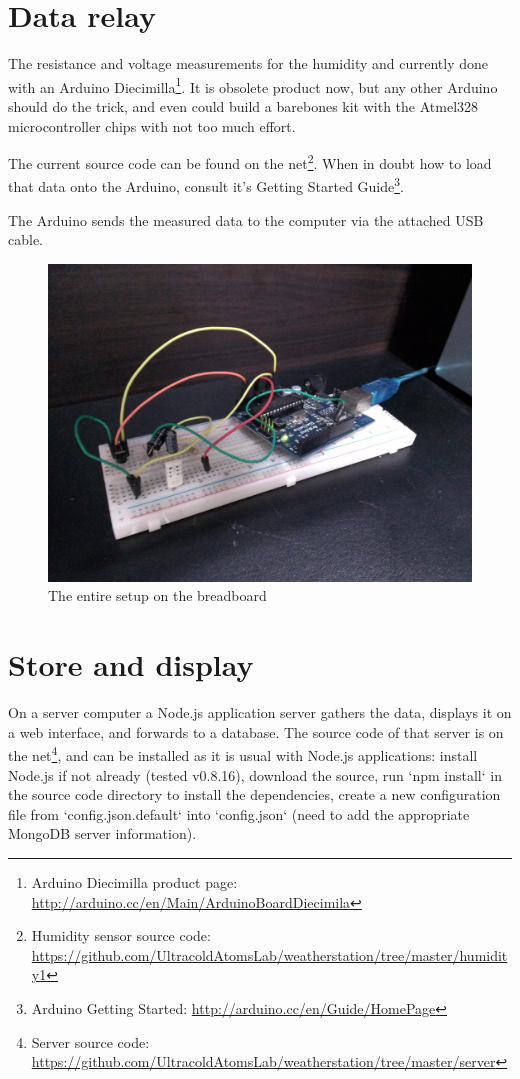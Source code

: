 \documentclass[12pt,a4paper]{article}
\begin{document}
\section{Data relay}

The resistance and voltage measurements for the humidity and currently done with an Arduino Diecimilla\footnote{Arduino Diecimilla product page: \url{http://arduino.cc/en/Main/ArduinoBoardDiecimila}}. It is obsolete product now, but any other Arduino should do the trick, and even could build a barebones kit with the Atmel328 microcontroller chips with not too much effort.

The current source code can be found on the net\footnote{Humidity sensor source code: \url{https://github.com/UltracoldAtomsLab/weatherstation/tree/master/humidity1}}. When in doubt how to load that data onto the Arduino, consult it's Getting Started Guide\footnote{Arduino Getting Started: \url{http://arduino.cc/en/Guide/HomePage}}.

The Arduino sends the measured data to the computer via the attached USB cable.

\begin{figure}[ht!]
\centering
\includegraphics[width=140mm]{setup.jpg}
\caption{The entire setup on the breadboard}
\label{fig:setup}
\end{figure}

\section{Store and display}

On a server computer a Node.js application server gathers the data, displays it on a web interface, and forwards to a database. The source code of that server is on the net\footnote{Server source code: \url{https://github.com/UltracoldAtomsLab/weatherstation/tree/master/server}}, and can be installed as it is usual with Node.js applications: install Node.js if not already (tested v0.8.16), download the source, run `npm install` in the source code directory to install the dependencies, create a new configuration file from `config.json.default` into `config.json` (need to add the appropriate MongoDB server information).
\end{document}
